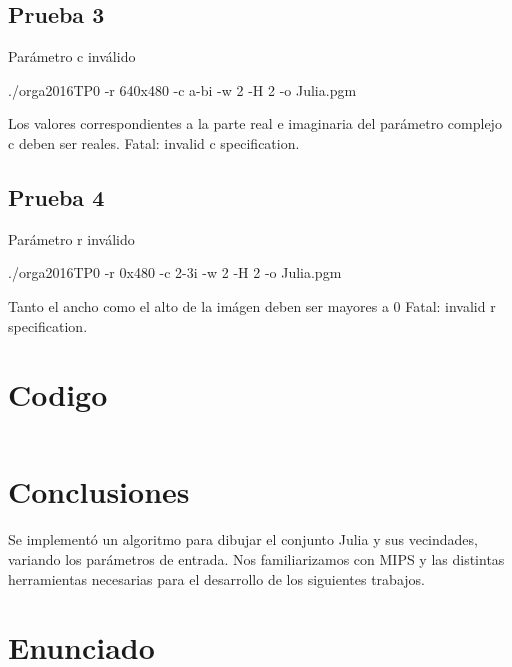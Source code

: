 \documentclass{article}
\begin{document}
\raggedright
\subsection{Prueba 3}
Par\'ametro c inv\'alido
\begin{center}
    ./orga2016TP0 -r 640x480 -c a-bi -w 2 -H 2 -o Julia.pgm\\
\end{center}
Los valores correspondientes a la parte real e imaginaria del par\'ametro complejo c deben ser reales.
\center
Fatal: invalid c specification.

\raggedright
\subsection{Prueba 4}
Par\'ametro r inv\'alido
\begin{center}
    ./orga2016TP0 -r 0x480 -c 2-3i -w 2 -H 2 -o Julia.pgm\\
\end{center}
Tanto el ancho como el alto de la im\'agen deben ser mayores a 0
\center
Fatal: invalid r specification.

\newpage
\raggedright
\section{Codigo}
\begin{lstlisting}
\end{lstlisting}

\raggedright
\section{Conclusiones}
\indent Se implement\'o un algoritmo para dibujar el conjunto Julia y sus vecindades, variando los par\'ametros de entrada. Nos familiarizamos con MIPS y las distintas herramientas necesarias para el desarrollo de los siguientes trabajos.

\section{Enunciado}

\end{document}
